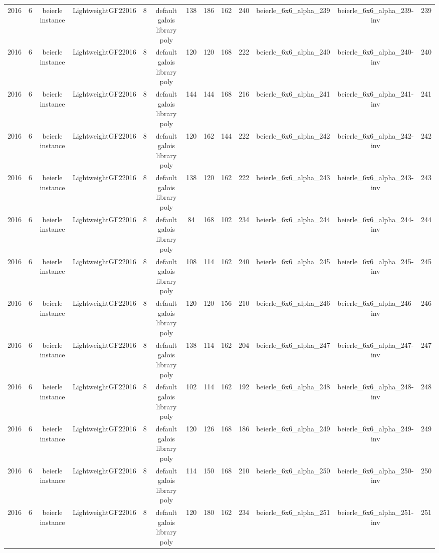 \begin{tabular}{c c c c c c c c c c c c c}
2016 & 6 & beierle instance & LightweightGF22016 & 8 & default galois library poly & 138 & 186 & 162 & 240 & beierle_6x6_alpha_239 & beierle_6x6_alpha_239-inv & 239 \\
2016 & 6 & beierle instance & LightweightGF22016 & 8 & default galois library poly & 120 & 120 & 168 & 222 & beierle_6x6_alpha_240 & beierle_6x6_alpha_240-inv & 240 \\
2016 & 6 & beierle instance & LightweightGF22016 & 8 & default galois library poly & 144 & 144 & 168 & 216 & beierle_6x6_alpha_241 & beierle_6x6_alpha_241-inv & 241 \\
2016 & 6 & beierle instance & LightweightGF22016 & 8 & default galois library poly & 120 & 162 & 144 & 222 & beierle_6x6_alpha_242 & beierle_6x6_alpha_242-inv & 242 \\
2016 & 6 & beierle instance & LightweightGF22016 & 8 & default galois library poly & 138 & 120 & 162 & 222 & beierle_6x6_alpha_243 & beierle_6x6_alpha_243-inv & 243 \\
2016 & 6 & beierle instance & LightweightGF22016 & 8 & default galois library poly & 84 & 168 & 102 & 234 & beierle_6x6_alpha_244 & beierle_6x6_alpha_244-inv & 244 \\
2016 & 6 & beierle instance & LightweightGF22016 & 8 & default galois library poly & 108 & 114 & 162 & 240 & beierle_6x6_alpha_245 & beierle_6x6_alpha_245-inv & 245 \\
2016 & 6 & beierle instance & LightweightGF22016 & 8 & default galois library poly & 120 & 120 & 156 & 210 & beierle_6x6_alpha_246 & beierle_6x6_alpha_246-inv & 246 \\
2016 & 6 & beierle instance & LightweightGF22016 & 8 & default galois library poly & 138 & 114 & 162 & 204 & beierle_6x6_alpha_247 & beierle_6x6_alpha_247-inv & 247 \\
2016 & 6 & beierle instance & LightweightGF22016 & 8 & default galois library poly & 102 & 114 & 162 & 192 & beierle_6x6_alpha_248 & beierle_6x6_alpha_248-inv & 248 \\
2016 & 6 & beierle instance & LightweightGF22016 & 8 & default galois library poly & 120 & 126 & 168 & 186 & beierle_6x6_alpha_249 & beierle_6x6_alpha_249-inv & 249 \\
2016 & 6 & beierle instance & LightweightGF22016 & 8 & default galois library poly & 114 & 150 & 168 & 210 & beierle_6x6_alpha_250 & beierle_6x6_alpha_250-inv & 250 \\
2016 & 6 & beierle instance & LightweightGF22016 & 8 & default galois library poly & 120 & 180 & 162 & 234 & beierle_6x6_alpha_251 & beierle_6x6_alpha_251-inv & 251 \\

\end{tabular}
